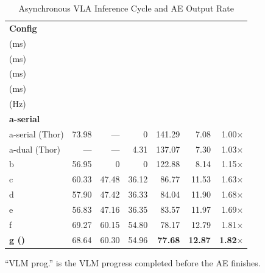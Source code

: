 \begin{table}[!t]
\caption{Asynchronous VLA Inference Cycle and AE Output Rate}
\label{tab:performance}
\centering
\footnotesize
\setlength{\tabcolsep}{2.6pt}
\begin{tabular*}{\textwidth}{@{\extracolsep{\fill}}lrrrrrr@{}}
\toprule
\textbf{Config} & \hcell{\textbf{AE done}\\(ms)} & \hcell{\textbf{VLM prog.}\\(ms)} & \hcell{$\bm{t_{\mathrm{overlap}}}$\\(ms)} & \hcell{$\bm{T_{\mathrm{async\_VLA}}}$\\(ms)} & \hcell{\textbf{Rate}\\(Hz)} & \hcell{\textbf{vs.}\\\textbf{a-serial}} \\
\midrule
a-serial (Thor) & 73.98 & --- & 0 & 141.29 & 7.08 & 1.00$\times$ \\
a-dual (Thor) & --- & --- & 4.31 & 137.07 & 7.30 & 1.03$\times$ \\
b & 56.95 & 0 & 0 & 122.88 & 8.14 & 1.15$\times$ \\
c & 60.33 & 47.48 & 36.12 & 86.77 & 11.53 & 1.63$\times$ \\
d & 57.90 & 47.42 & 36.33 & 84.04 & 11.90 & 1.68$\times$ \\
e & 56.83 & 47.16 & 36.35 & 83.57 & 11.97 & 1.69$\times$ \\
f & 69.27 & 60.15 & 54.80 & 78.17 & 12.79 & 1.81$\times$ \\
\textbf{g (\sys{})} & 68.64 & 60.30 & 54.96 & \textbf{77.68} & \textbf{12.87} & \textbf{1.82}$\bm{\times}$ \\
\bottomrule
\end{tabular*}
\par\smallskip
\parbox{\textwidth}{\scriptsize ``VLM prog.'' is the VLM progress completed before the AE finishes.}
\end{table}
